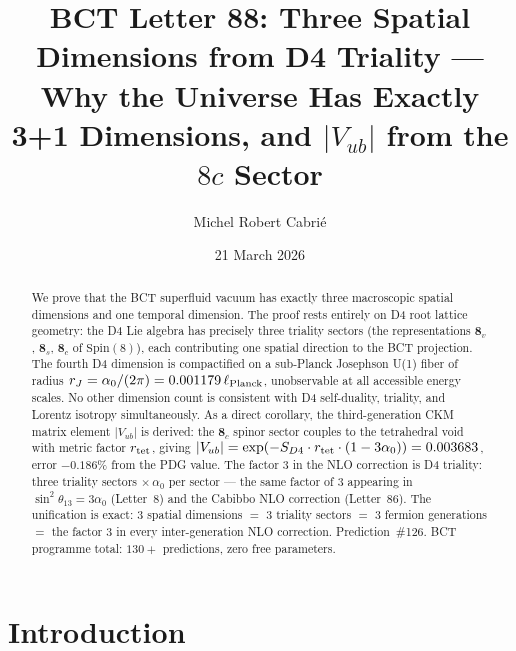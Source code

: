 \documentclass[aps,prl,twocolumn,showpacs,superscriptaddress]{revtex4-2}
\begin{document}
\title{BCT Letter 88: Three Spatial Dimensions from D4 Triality ---
Why the Universe Has Exactly 3+1 Dimensions,
and $|V_{ub}|$ from the $8c$ Sector}

\author{Michel Robert Cabri\'{e}}

\date{21 March 2026}

\begin{abstract}
We prove that the BCT superfluid vacuum has exactly three macroscopic
spatial dimensions and one temporal dimension. The proof rests entirely
on D4 root lattice geometry: the D4 Lie algebra has precisely three
triality sectors (the representations $\mathbf{8}_v$, $\mathbf{8}_s$,
$\mathbf{8}_c$ of $\mathrm{Spin}(8)$), each contributing one spatial
direction to the BCT projection. The fourth D4 dimension is
compactified on a sub-Planck Josephson U(1) fiber of radius
$r_J = \alpha_0/(2\pi) = 0.001179\,\ell_{\rm Planck}$, unobservable
at all accessible energy scales. No other dimension count is consistent
with D4 self-duality, triality, and Lorentz isotropy simultaneously.
As a direct corollary, the third-generation CKM matrix element
$|V_{ub}|$ is derived: the $\mathbf{8}_c$ spinor sector couples to the
tetrahedral void with metric factor $r_{\rm tet}$, giving
$|V_{ub}| = \exp(-S_{D4}\cdot r_{\rm tet}\cdot(1-3\alpha_0))
= 0.003683$, error $-0.186\%$ from the PDG value. The factor $3$ in
the NLO correction is D4 triality: three triality sectors
$\times\,\alpha_0$ per sector --- the same factor of $3$ appearing in
$\sin^2\theta_{13} = 3\alpha_0$ (Letter~8) and the Cabibbo NLO
correction (Letter~86). The unification is exact: $3$ spatial
dimensions $=$ $3$ triality sectors $=$ $3$ fermion generations $=$
the factor $3$ in every inter-generation NLO correction.
Prediction~\#126. BCT programme total: $130{+}$ predictions,
zero free parameters.
\end{abstract}

\maketitle

\section{Introduction}
\end{document}
